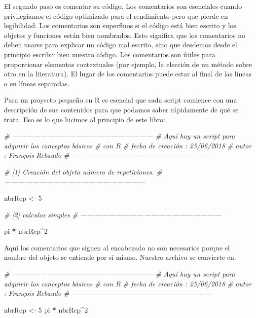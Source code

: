 \documentclass[
]{book}
\newenvironment{Shaded}{\begin{snugshade}}{\end{snugshade}}
\newcommand{\CommentTok}[1]{\textcolor[rgb]{0.56,0.35,0.01}{\textit{#1}}}
\newcommand{\DecValTok}[1]{\textcolor[rgb]{0.00,0.00,0.81}{#1}}
\newcommand{\NormalTok}[1]{#1}
\newcommand{\OperatorTok}[1]{\textcolor[rgb]{0.81,0.36,0.00}{\textbf{#1}}}
\newcommand{\StringTok}[1]{\textcolor[rgb]{0.31,0.60,0.02}{#1}}
\begin{document}
El segundo paso es comentar su código. Los comentarios son esenciales cuando privilegiamos el código optimizado para el rendimiento pero que pierde en legibilidad. Los comentarios son superfluos si el código está bien escrito y los objetos y funciones están bien nombrados. Esto significa que los comentarios no deben usarse para explicar un código mal escrito, sino que desdemos desde el principio escribir bien nuestro código. Los comentarios son útiles para proporcionar elementos contextuales (por ejemplo, la elección de un método sobre otro en la literatura). El lugar de los comentarios puede estar al final de las líneas o en líneas separadas.

Para un proyecto pequeño en R es esencial que cada script comience con una descripción de sus contenidos para que podamos saber rápidamente de qué se trata. Eso es lo que hicimos al principio de este libro:

\begin{Shaded}
\begin{Highlighting}[]
\CommentTok{# ------------------------------------------------------------}
\CommentTok{# Aquí hay un script para adquirir los conceptos básicos}
\CommentTok{# con R}
\CommentTok{# fecha de creación : 25/06/2018}
\CommentTok{# autor : François Rebaudo}
\CommentTok{# ------------------------------------------------------------}

\CommentTok{# [1] Creación del objeto número de repeticiones.}
\CommentTok{# ------------------------------------------------------------}

\NormalTok{nbrRep <-}\StringTok{ }\DecValTok{5}

\CommentTok{# [2] calculos simples}
\CommentTok{# ------------------------------------------------------------}

\NormalTok{pi }\OperatorTok{*}\StringTok{ }\NormalTok{nbrRep}\OperatorTok{^}\DecValTok{2}
\end{Highlighting}
\end{Shaded}

Aquí los comentarios que siguen al encabezado no son necesarios porque el nombre del objeto se entiende por sí mismo. Nuestro archivo se convierte en:

\begin{Shaded}
\begin{Highlighting}[]
\CommentTok{# ------------------------------------------------------------}
\CommentTok{# Aquí hay un script para adquirir los conceptos básicos}
\CommentTok{# con R}
\CommentTok{# fecha de creación : 25/06/2018}
\CommentTok{# autor : François Rebaudo}
\CommentTok{# ------------------------------------------------------------}

\NormalTok{nbrRep <-}\StringTok{ }\DecValTok{5}
\NormalTok{pi }\OperatorTok{*}\StringTok{ }\NormalTok{nbrRep}\OperatorTok{^}\DecValTok{2}
\end{Highlighting}
\end{Shaded}
\end{document}
